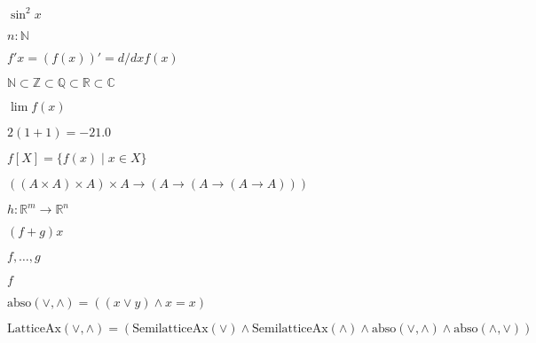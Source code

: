 \documentclass{article}
\begin{document}
$\sin ^2x$

$n:\mathbb N $

$f'x = (f(x))' = d/dxf(x)$

$\mathbb N  \subset \mathbb Z  \subset \mathbb Q  \subset \mathbb R  \subset \mathbb C $

$\lim f(x)$

$2(1+1) = -21.0$

$f[X] = \{f(x) \mid x \in X\}$

$((A\times A)\times A)\times A\to (A\to (A\to (A\to A)))$

$h:\mathbb R ^m\to \mathbb R ^n$

$(f+g)x$

$f,\dots ,g$

$f$

$\mbox{abso}(\vee ,\wedge ) = ((x\vee y)\wedge x = x)$

$\mbox{LatticeAx}(\vee ,\wedge ) = (\mbox{SemilatticeAx}(\vee ) \land \mbox{SemilatticeAx}(\wedge ) \land \mbox{abso}(\vee ,\wedge ) \land \mbox{abso}(\wedge ,\vee ))$
\end{document}
